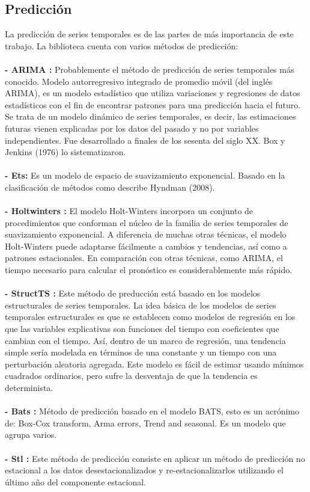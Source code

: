 \documentclass[14pt]{extarticle}
\theoremstyle{definition}
\theoremstyle{remark}
\begin{document}
\subsection{Predicción}\label{sec:Prediccion}
La predicción de series temporales es de las partes de más importancia de este trabajo. La biblioteca cuenta con varios métodos de predicción:\\\\
\textbf{- ARIMA \citep{wiki:arima}:} Probablemente el método de predicción de series temporales más conocido. Modelo autorregresivo integrado de promedio móvil (del inglés ARIMA), es un modelo estadístico que utiliza variaciones y regresiones de datos estadísticos con el fin de encontrar patrones para una predicción hacia el futuro. Se trata de un modelo dinámico de series temporales, es decir, las estimaciones futuras vienen explicadas por los datos del pasado y no por variables independientes. Fue desarrollado a finales de los sesenta del siglo XX. Box y Jenkins (1976) lo sistematizaron.\\\\
\textbf{- Ets:} Es un modelo de espacio de suavizamiento exponencial. Basado en la clasificación de métodos como describe Hyndman (2008).\\\\
\textbf{- Holtwinters \citep{wiki:holtwinters}:} El modelo Holt-Winters incorpora un conjunto de procedimientos que conforman el núcleo de la familia de series temporales de suavizamiento exponencial. A diferencia de muchas otras técnicas, el modelo Holt-Winters puede adaptarse fácilmente a cambios y tendencias, así como a patrones estacionales. En comparación con otras técnicas, como ARIMA, el tiempo necesario para calcular el pronóstico es considerablemente más rápido.\\\\
\textbf{- StructTS \citep{web:structts}:} Este método de preducción está basado en los modelos estructurales de series temporales. La idea básica de los modelos de series temporales estructurales es que se establecen como modelos de regresión en los que las variables explicativas son funciones del tiempo con coeficientes que cambian con el tiempo. Así, dentro de un marco de regresión, una tendencia simple sería modelada en términos de una constante y un tiempo con una perturbación aleatoria agregada. Este modelo es fácil de estimar usando mínimos cuadrados ordinarios, pero sufre la desventaja de que la tendencia es determinista.\\\\
\textbf{- Bats \citep{article:bats}:} Método de predicción basado en el modelo BATS, esto es un acrónimo de: Box-Cox transform, Arma errors, Trend and seasonal. Es un modelo que agrupa varios.\\\\
\textbf{- Stl \citep{web:stl}:} Este método de predicción consiste en aplicar un método de predicción no estacional a los datos desestacionalizados y re-estacionalizarlos utilizando el último año del componente estacional.
\end{document}
